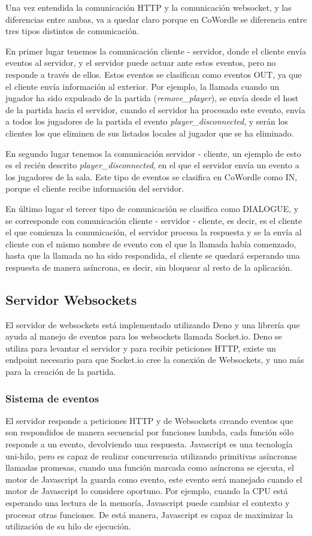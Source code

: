 Una vez entendida la comunicación HTTP y la comunicación websocket, y las diferencias entre ambas, va a quedar claro porque en CoWordle se diferencia entre tres tipos distintos de comunicación.

En primer lugar tenemos la comunicación cliente - servidor, donde el cliente envía eventos al servidor, y el servidor puede actuar ante estos eventos, pero no responde a través de ellos. 
Estos eventos se clasifican como eventos OUT, ya que el cliente envía información al exterior. Por ejemplo, la llamada cuando un jugador ha sido expulsado de la partida (\textit{remove\_player}), se envía desde el host de la partida hacia el servidor, cuando el servidor ha procesado este evento, envía a todos los jugadores de la partida el evento \textit{player\_disconnected}, y serán los clientes los que eliminen de sus listados locales al jugador que se ha eliminado.

En segundo lugar tenemos la comunicación servidor - cliente, un ejemplo de esto es el recién descrito \textit{player\_disconnected}, en el que el servidor envía un evento a los jugadores de la sala. Este tipo de eventos se clasifica en CoWordle como IN, porque el cliente recibe información del servidor.

En último lugar el tercer tipo de comunicación se clasifica como DIALOGUE, y se corresponde con comunicación cliente - servidor - cliente, es decir, es el cliente el que comienza la comunicación, el servidor procesa la respuesta y se la envía al cliente con el mismo nombre de evento con el que la llamada había comenzado, hasta que la llamada no ha sido respondida, el cliente se quedará esperando una respuesta de manera asíncrona, es decir, sin bloquear al resto de la aplicación.

\subsection{Servidor Websockets}
El servidor de websockets está implementado utilizando Deno y una librería que ayuda al manejo de eventos para los websockets llamada Socket.io. Deno se utiliza para levantar el servidor y para recibir peticiones HTTP, existe un endpoint necesario para que Socket.io cree la conexión de Websockets, y uno más para la creación de la partida. 

\subsubsection{Sistema de eventos}
El servidor responde a peticiones HTTP y de Websockets creando eventos que son respondidos de manera secuencial por funciones lambda, cada función sólo responde a un evento, devolviendo una respuesta.
Javascript es una tecnología uni-hilo, pero es capaz de realizar concurrencia utilizando primitivas asíncronas llamadas promesas, cuando una función marcada como asíncrona se ejecuta, el motor de Javascript la guarda como evento, este evento será manejado cuando el motor de Javascript lo considere oportuno. Por ejemplo, cuando la CPU está esperando una lectura de la memoría, Javascript puede cambiar el contexto y procesar otras funciones. De está manera, Javascript es capaz de maximizar la utilización de su hilo de ejecución.


